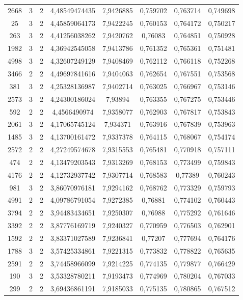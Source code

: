 \begin{longtable}{|c|c|c|c|c|c|c|c|}
2668 & 3 & 2 & 4,48549474435 & 7,9426885 & 0,759702 & 0,763714 & 0,749698 \\
25 & 3 & 2 & 4,45859064173 & 7,9422245 & 0,760153 & 0,764172 & 0,750217 \\
263 & 3 & 2 & 4,41256038262 & 7,9420762 & 0,76083 & 0,764851 & 0,750928 \\
1982 & 3 & 2 & 4,36942545058 & 7,9413786 & 0,761352 & 0,765361 & 0,751481 \\
4998 & 3 & 2 & 4,32607249129 & 7,9408469 & 0,762112 & 0,766118 & 0,752268 \\
3466 & 2 & 2 & 4,49697841616 & 7,9404063 & 0,762654 & 0,767551 & 0,753568 \\
381 & 3 & 2 & 4,25328136987 & 7,9402714 & 0,763025 & 0,766967 & 0,753146 \\
2573 & 3 & 2 & 4,24300186024 & 7,93894 & 0,763355 & 0,767275 & 0,753446 \\
592 & 2 & 2 & 4,4566490974 & 7,9358077 & 0,762903 & 0,767817 & 0,753843 \\
2061 & 3 & 2 & 4,17065745124 & 7,934371 & 0,763916 & 0,767839 & 0,753963 \\
1485 & 3 & 2 & 4,13700161472 & 7,9337378 & 0,764115 & 0,768067 & 0,754174 \\
2572 & 2 & 2 & 4,27249574678 & 7,9315553 & 0,765481 & 0,770918 & 0,757111 \\
474 & 2 & 2 & 4,13479203543 & 7,9313269 & 0,768153 & 0,773499 & 0,759843 \\
4176 & 2 & 2 & 4,12732937742 & 7,9307714 & 0,768583 & 0,77389 & 0,760243 \\
981 & 3 & 2 & 3,86070976181 & 7,9294162 & 0,768762 & 0,773329 & 0,759793 \\
4991 & 2 & 2 & 4,09786791054 & 7,9272385 & 0,76881 & 0,774102 & 0,760443 \\
3794 & 2 & 2 & 3,94483434651 & 7,9250307 & 0,76988 & 0,775292 & 0,761646 \\
3392 & 2 & 2 & 3,87776169719 & 7,9240327 & 0,770959 & 0,776503 & 0,762901 \\
1592 & 2 & 2 & 3,83371027589 & 7,9236841 & 0,77207 & 0,777694 & 0,764176 \\
1788 & 3 & 2 & 3,57425334861 & 7,9221315 & 0,773832 & 0,778822 & 0,765635 \\
2591 & 2 & 2 & 3,74458966099 & 7,9214225 & 0,774135 & 0,779877 & 0,766429 \\
190 & 3 & 2 & 3,53328780211 & 7,9193473 & 0,774969 & 0,780204 & 0,767033 \\
299 & 2 & 2 & 3,69436861191 & 7,9185033 & 0,775135 & 0,780865 & 0,767512 \\

\end{longtable}
